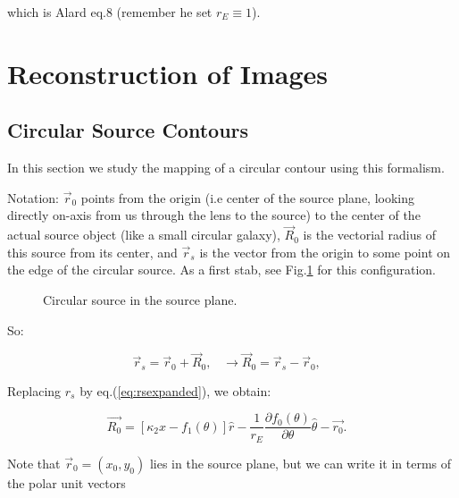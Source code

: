 \documentclass{article}
\def\be{\begin{equation}}
\def\ee{\end{equation}}
\def\eqref{eq.(\ref}
\def\figref{Fig.\ref}
\def\rar{\rightarrow}
\begin{document}
which is Alard eq.8 (remember he set $r_E \equiv 1$).


\section{Reconstruction of Images}


\subsection{Circular Source Contours}

In this section we study the mapping of a circular contour using this formalism.

Notation: $ \vec{r}_{0}$ points from the origin (i.e center of the
source plane, looking directly on-axis from us through the lens to the
source) to the center of the actual source object (like a small
circular galaxy), $ \vec{R}_{0}$ is the vectorial radius of this
source from its center, and $ \vec{r}_{s}$ is the vector from the
origin to some point on the edge of the circular source. As a first
stab, see \figref{fig:sourceplane} for this configuration.



\begin{figure}
\begin{center}
\caption{\label{fig:sourceplane} Circular source in the source plane.}
\end{center}
\end{figure}

So:

\be
\vec{r}_s =  \vec{r}_{0} + \vec{R}_{0} , \;\;\; \rar \vec{R}_{0} = \vec{r}_s - \vec{r}_{0}, \;\;\; 
\ee


Replacing $r_s$ by \eqref{eq:rsexpanded}), we obtain:

\be
\label{eq:Rzero}
\vec{R_{0}} = \left[ \kappa_2 x - f_{1}(\theta) \right]\hat{r} - \frac{1}{r_E} \frac{\partial f_0(\theta)}{\partial \theta} \hat{\theta} - \vec{r_{0}}. \;\;\; 
\ee


Note that $\vec{r}_{0} = (x_0,y_0)$ lies in the source plane, but we
can write it in terms of the polar unit vectors 
\end{document}
